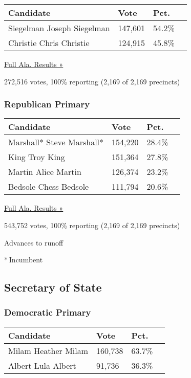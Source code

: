 \begin{longtable}[]{@{}llll@{}}
\toprule
Candidate & Vote & Pct. &\tabularnewline
\midrule
\endhead
 Siegelman Joseph Siegelman & 147,601 & 54.2\% &\tabularnewline
 Christie Chris Christie & 124,915 & 45.8\% &\tabularnewline
\bottomrule
\end{longtable}

\href{https://www.nytimes3xbfgragh.onion/elections/results/alabama}{Full
Ala. Results »}

272,516 votes, 100\% reporting (2,169 of 2,169 precincts)

\hypertarget{republican-primary-8}{%
\subsubsection{Republican Primary}\label{republican-primary-8}}

\begin{longtable}[]{@{}llll@{}}
\toprule
Candidate & Vote & Pct. &\tabularnewline
\midrule
\endhead
 Marshall* Steve Marshall* & 154,220 & 28.4\% &\tabularnewline
 King Troy King & 151,364 & 27.8\% &\tabularnewline
 Martin Alice Martin & 126,374 & 23.2\% &\tabularnewline
 Bedsole Chess Bedsole & 111,794 & 20.6\% &\tabularnewline
\bottomrule
\end{longtable}

\href{https://www.nytimes3xbfgragh.onion/elections/results/alabama}{Full
Ala. Results »}

543,752 votes, 100\% reporting (2,169 of 2,169 precincts)

 Advances to runoff

* Incumbent

\hypertarget{secretary-of-state}{%
\subsection{Secretary of State}\label{secretary-of-state}}

\hypertarget{democratic-primary-10}{%
\subsubsection{Democratic Primary}\label{democratic-primary-10}}

\begin{longtable}[]{@{}llll@{}}
\toprule
Candidate & Vote & Pct. &\tabularnewline
\midrule
\endhead
 Milam Heather Milam & 160,738 & 63.7\% &\tabularnewline
 Albert Lula Albert & 91,736 & 36.3\% &\tabularnewline
\bottomrule
\end{longtable}

